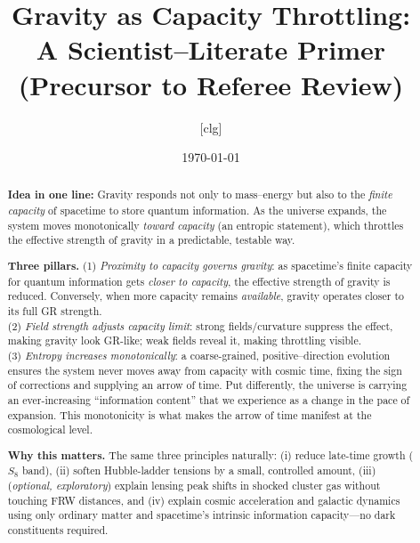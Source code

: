 \documentclass[aps,prd,onecolumn,superscriptaddress,nofootinbib]{revtex4-2}
\begin{document}
\title{Gravity as Capacity Throttling:\\
A Scientist--Literate Primer (Precursor to Referee Review)}

\author{[clg]}
\affiliation{[Institution(s)]}
\date{\today}

\begin{abstract}
\textbf{Idea in one line:} Gravity responds not only to mass--energy but also to the \emph{finite capacity} of spacetime to store quantum information. As the universe expands, the system moves monotonically \emph{toward capacity} (an entropic statement), which throttles the effective strength of gravity in a predictable, testable way.

\smallskip
\textbf{Three pillars.}
(1) \emph{Proximity to capacity governs gravity}: as spacetime's finite capacity for quantum information gets \emph{closer to capacity}, the effective strength of gravity is reduced. Conversely, when more capacity remains \emph{available}, gravity operates closer to its full GR strength.\\
(2) \emph{Field strength adjusts capacity limit}: strong fields/curvature suppress the effect, making gravity look GR-like; weak fields reveal it, making throttling visible.\\
(3) \emph{Entropy increases monotonically}: a coarse-grained, positive--direction evolution ensures the system never moves away from capacity with cosmic time, fixing the sign of corrections and supplying an arrow of time. Put differently, the universe is carrying an ever-increasing ``information content'' that we experience as a change in the pace of expansion. This monotonicity is what makes the arrow of time manifest at the cosmological level.

\smallskip
\textbf{Why this matters.} The same three principles naturally: (i) reduce late-time growth ($S_8$ band), (ii) soften Hubble-ladder tensions by a small, controlled amount, (iii) (\emph{optional, exploratory}) explain lensing peak shifts in shocked cluster gas without touching FRW distances, and (iv) explain cosmic acceleration and galactic dynamics using only ordinary matter and spacetime's intrinsic information capacity---no dark constituents required.
\end{abstract}

\maketitle
\end{document}
